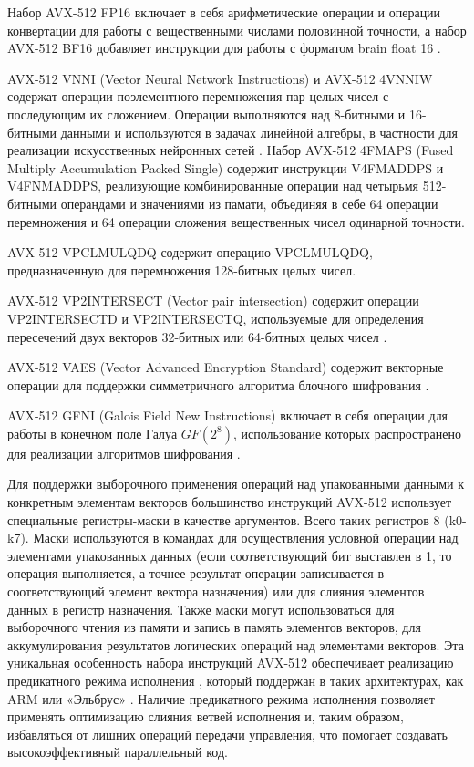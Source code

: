 Набор AVX-512 FP16\label{abbr:fp-1} включает в себя арифметические операции и операции конвертации для работы с вещественными числами половинной точности, а набор AVX-512 BF16\label{abbr:bf-1} добавляет инструкции для работы с форматом brain float 16 \cite{Kalamkar2019VecBF16}.

AVX-512 VNNI\label{abbr:vnni-1} (Vector Neural Network Instructions) и AVX-512 4VNNIW\label{abbr:vnniw-1} содержат операции поэлементного перемножения пар целых чисел с последующим их сложением.
Операции выполняются над 8-битными и 16-битными данными и используются в задачах линейной алгебры, в частности для реализации искусственных нейронных сетей \cite{Zhou2024VecVNNI}.
Набор AVX-512 4FMAPS\label{abbr:fmaps-1} (Fused Multiply Accumulation Packed Single) содержит инструкции V4FMADDPS и V4FNMADDPS, реализующие комбинированные операции над четырьмя 512-битными операндами и значениями из памати, объединяя в себе 64 операции перемножения и 64 операции сложения вещественных чисел одинарной точности.

AVX-512 VPCLMULQDQ содержит операцию VPCLMULQDQ, предназначенную для перемножения 128-битных целых чисел.

AVX-512 VP2INTERSECT (Vector pair intersection) содержит операции VP2INTERSECTD и VP2INTERSECTQ, используемые для определения пересечений двух векторов 32-битных или 64-битных целых чисел \cite{DiezCanas2021VecVP2Int}.

AVX-512 VAES\label{abbr:vaes-1} (Vector Advanced Encryption Standard) содержит векторные операции для поддержки симметричного алгоритма блочного шифрования \cite{Kovats2024VecAES}.

AVX-512 GFNI\label{abbr:gfni-1} (Galois Field New Instructions) включает в себя операции для работы в конечном поле Галуа $GF(2^8)$\label{abbr:gf-1}, использование которых распространено для реализации алгоритмов шифрования \cite{Yoo2023VecGFNI}.

Для поддержки выборочного применения операций над упакованными данными к конкретным элементам векторов большинство инструкций AVX-512\label{abbr:avx-6} использует специальные регистры-маски в качестве аргументов.
Всего таких регистров 8 (k0-k7).
Маски используются в командах для осуществления условной операции над элементами упакованных данных (если соответствующий бит выставлен в 1, то операция выполняется, а точнее результат операции записывается в соответствующий элемент вектора назначения) или для слияния элементов данных в регистр назначения.
Также маски могут использоваться для выборочного чтения из памяти и запись в память элементов векторов, для аккумулирования результатов логических операций над элементами векторов.
Эта уникальная особенность набора инструкций AVX-512 обеспечивает реализацию предикатного режима исполнения \cite{Volkonsky2003VecPred}, который поддержан в таких архитектурах, как ARM\label{abbr:arm-2} или «Эльбрус» \cite{Kim2013VecElb}.
Наличие предикатного режима исполнения позволяет применять оптимизацию слияния ветвей исполнения и, таким образом, избавляться от лишних операций передачи управления, что помогает создавать высокоэффективный параллельный код.

